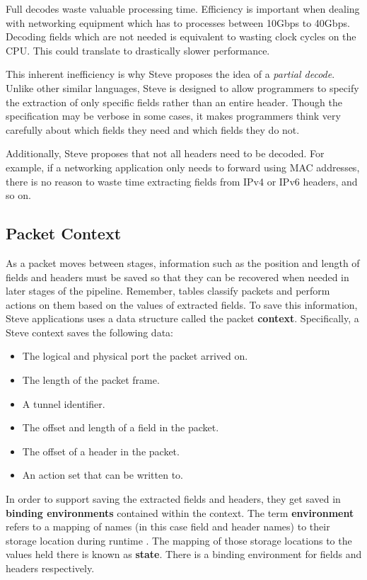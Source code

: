 Full decodes waste valuable processing time. Efficiency is important when dealing with networking equipment which has to processes between 10Gbps to 40Gbps. Decoding fields which are not needed is equivalent to wasting clock cycles on the CPU. This could translate to drastically slower performance.

This inherent inefficiency is why Steve proposes the idea of a \textit{partial decode}. Unlike other similar languages, Steve is designed to allow programmers to specify the extraction of only specific fields rather than an entire header. Though the specification may be verbose in some cases, it makes programmers think very carefully about which fields they need and which fields they do not.

Additionally, Steve proposes that not all headers need to be decoded. For example, if a networking application only needs to forward using MAC addresses, there is no reason to waste time extracting fields from IPv4 or IPv6 headers, and so on.
 
\subsection{Packet Context}

As a packet moves between stages, information such as the position and length of fields and headers must be saved so that they can be recovered when needed in later stages of the pipeline. Remember, tables classify packets and perform actions on them based on the values of extracted fields. To save this information, Steve applications uses a data structure called the packet \textbf{context}. Specifically, a Steve context saves the following data:

\begin{itemize}
\item The logical and physical port the packet arrived on.
\item The length of the packet frame.
\item A tunnel identifier.
\item The offset and length of a field in the packet.
\item The offset of a header in the packet.
\item An action set that can be written to.
\end{itemize}

In order to support saving the extracted fields and headers, they get saved in \textbf{binding environments} contained within the context. The term \textbf{environment} refers to a mapping of names (in this case field and header names) to their storage location during runtime \cite{compilers1}. The mapping of those storage locations to the values held there is known as \textbf{state}. There is a binding environment for fields and headers respectively.

